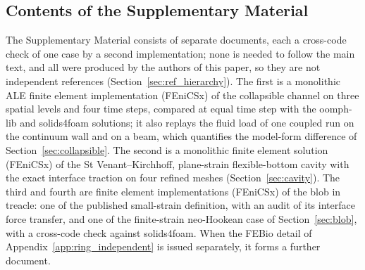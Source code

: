 \documentclass[sn-mathphys,Numbered]{sn-jnl}%
\begin{document}
\begin{appendices}






\section{Contents of the Supplementary Material}
\label{app:supplementary}
The Supplementary Material consists of separate documents, each a cross-code check of one case by a second implementation; none is needed to follow the main text, and all were produced by the authors of this paper, so they are not independent references (Section~\ref{sec:ref_hierarchy}).
The first is a monolithic ALE finite element implementation (FEniCSx) of the collapsible channel on three spatial levels and four time steps, compared at equal time step with the oomph-lib and solids4foam solutions; it also replays the fluid load of one coupled run on the continuum wall and on a beam, which quantifies the model-form difference of Section~\ref{sec:collapsible}.
The second is a monolithic finite element solution (FEniCSx) of the St Venant--Kirchhoff, plane-strain flexible-bottom cavity with the exact interface traction on four refined meshes (Section~\ref{sec:cavity}).
The third and fourth are finite element implementations (FEniCSx) of the blob in treacle: one of the published small-strain definition, with an audit of its interface force transfer, and one of the finite-strain neo-Hookean case of Section~\ref{sec:blob}, with a cross-code check against solids4foam.
When the FEBio detail of Appendix~\ref{app:ring_independent} is issued separately, it forms a further document.

\end{appendices}


\end{document}

